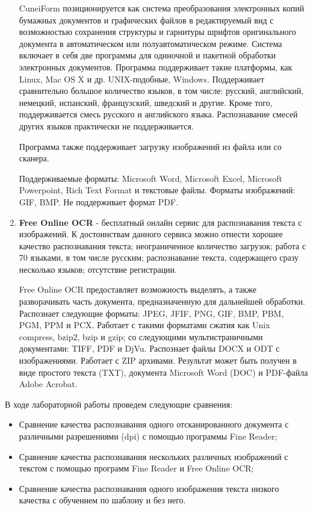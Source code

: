 \begin{enumerate}
		CuneiForm позиционируется как система преобразования электронных копий бумажных документов и графических файлов в редактируемый вид с возможностью сохранения структуры и гарнитуры шрифтов оригинального документа в автоматическом или полуавтоматическом режиме. Система включает в себя две программы для одиночной и пакетной обработки электронных документов.
		Программа поддерживает такие платформы, как Linux, Mac OS X и др. UNIX-подобные, Windows.
		Поддерживает сравнительно большое количество языков, в том числе: русский, английский, немецкий, испанский, французский, шведский и другие. Кроме того, поддерживается смесь русского и английского языка. Распознавание смесей других языков практически не поддерживается.
		
		Программа также поддерживает загрузку изображений из файла или со сканера.
		
		Поддерживаемые форматы: Microsoft Word, Microsoft Excel, Microsoft Powerpoint, Rich Text Format и текстовые файлы. Форматы изображений: GIF, BMP. Не поддерживает формат PDF.
		
		\item  \textbf{Free Online OCR} - бесплатный онлайн сервис для распознавания текста с изображений. К достоинствам данного сервиса можно отнести хорошее качество распознавания текста; неограниченное количество загрузок; работа с 70 языками, в том числе русским; распознавание текста, содержащего сразу несколько языков; отсутствие регистрации.
		
		Free Online OCR предоставляет возможность выделять, а также разворачивать часть документа, предназначенную для дальнейшей обработки. Распознает следующие форматы: JPEG, JFIF, PNG, GIF, BMP, PBM, PGM, PPM и PCX. Работает с такими форматами сжатия как Unix compress, bzip2, bzip и gzip; со следующими мультистраничными документами: TIFF, PDF и DjVu. Распознает файлы DOCX и ODT с изображениями. Работает с ZIP архивами. Результат может быть получен в виде простого текста (TXT), документа Microsoft Word (DOC) и PDF-файла Adobe Acrobat.
	\end{enumerate}
	
	В ходе лабораторной работы проведем следующие сравнения:
	\begin{itemize}
		\item Сравнение качества распознавания одного отсканированного документа с различными разрешениями (dpi) с помощью программы Fine Reader;
		\item Сравнение качества распознавания нескольких различных изображений с текстом с помощью программ Fine Reader и Free Online OCR;
		\item Сравнение качества распознавания одного изображения текста низкого качества с обучением по шаблону и без него.
	\end{itemize}	
	
